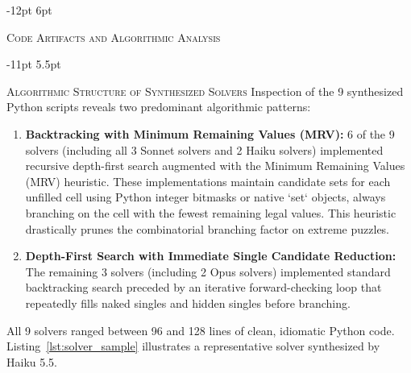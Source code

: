 \documentclass{article} %
\makeatletter
\renewcommand\section{\@startsection{section}{1}{\z@}%
  {-12pt \@plus -3pt \@minus -2pt}%
  {6pt \@plus 2pt}%
  {\normalfont\fontsize{12}{14}\selectfont\scshape\raggedright}}
\renewcommand\subsection{\@startsection{subsection}{2}{\z@}%
  {-11pt \@plus -3pt \@minus -2pt}%
  {5.5pt \@plus 2pt}%
  {\normalfont\fontsize{10}{12}\selectfont\scshape\raggedright}}
\makeatother
\begin{document}
\section{\textsc{Code Artifacts and Algorithmic Analysis}}
\label{app:code_artifacts}

\subsection{\textsc{Algorithmic Structure of Synthesized Solvers}}
Inspection of the 9 synthesized Python scripts reveals two predominant algorithmic patterns:
\begin{enumerate}
    \item \textbf{Backtracking with Minimum Remaining Values (MRV):} 6 of the 9 solvers (including all 3 Sonnet solvers and 2 Haiku solvers) implemented recursive depth-first search augmented with the Minimum Remaining Values (MRV) heuristic. These implementations maintain candidate sets for each unfilled cell using Python integer bitmasks or native `set` objects, always branching on the cell with the fewest remaining legal values. This heuristic drastically prunes the combinatorial branching factor on extreme puzzles.
    \item \textbf{Depth-First Search with Immediate Single Candidate Reduction:} The remaining 3 solvers (including 2 Opus solvers) implemented standard backtracking search preceded by an iterative forward-checking loop that repeatedly fills naked singles and hidden singles before branching.
\end{enumerate}

All 9 solvers ranged between 96 and 128 lines of clean, idiomatic Python code. Listing~\ref{lst:solver_sample} illustrates a representative solver synthesized by Haiku 5.5.
\end{document}
